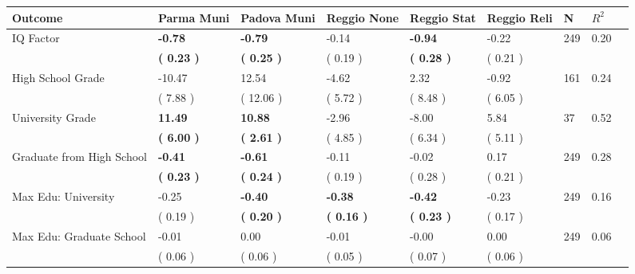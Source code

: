 \begin{tabular}{L{6.2cm} C{1.8cm} C{1.8cm} C{1.8cm} C{1.8cm} C{1.8cm} C{1.8cm} C{0.3cm} C{0.3cm}}
\toprule
 \textbf{Outcome} & \textbf{Parma Muni} & \textbf{Padova Muni} & \textbf{Reggio None} & \textbf{Reggio Stat} & \textbf{Reggio Reli} & \textbf{N} & \textbf{$ R^2$} \\
\midrule
IQ Factor & \textbf{    -0.78} & \textbf{    -0.79} &     -0.14 & \textbf{    -0.94} &     -0.22  & 249 &       0.20 \\ 
 & \textbf{(     0.23 )} & \textbf{(     0.25 )} & (     0.19 ) & \textbf{(     0.28 )} & (     0.21 )  & \\
High School Grade &    -10.47 &     12.54 &     -4.62 &      2.32 &     -0.92  & 161 &       0.24 \\ 
 & (     7.88 ) & (    12.06 ) & (     5.72 ) & (     8.48 ) & (     6.05 )  & \\
University Grade & \textbf{    11.49} & \textbf{    10.88} &     -2.96 &     -8.00 &      5.84  & 37 &       0.52 \\ 
 & \textbf{(     6.00 )} & \textbf{(     2.61 )} & (     4.85 ) & (     6.34 ) & (     5.11 )  & \\
Graduate from High School & \textbf{    -0.41} & \textbf{    -0.61} &     -0.11 &     -0.02 &      0.17  & 249 &       0.28 \\ 
 & \textbf{(     0.23 )} & \textbf{(     0.24 )} & (     0.19 ) & (     0.28 ) & (     0.21 )  & \\
Max Edu: University &     -0.25 & \textbf{    -0.40} & \textbf{    -0.38} & \textbf{    -0.42} &     -0.23  & 249 &       0.16 \\ 
 & (     0.19 ) & \textbf{(     0.20 )} & \textbf{(     0.16 )} & \textbf{(     0.23 )} & (     0.17 )  & \\
Max Edu: Graduate School &     -0.01 &      0.00 &     -0.01 &     -0.00 &      0.00  & 249 &       0.06 \\ 
 & (     0.06 ) & (     0.06 ) & (     0.05 ) & (     0.07 ) & (     0.06 )  & \\
\bottomrule
\end{tabular}
